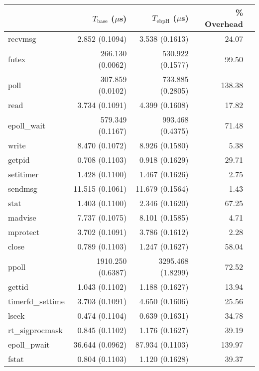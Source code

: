 \begin{tabular}{>{\ttfamily}lrrrr}
\toprule
\multicolumn{1}{l}{System Call} & $T_{\text{base}}$ ($\mu$s) & $T_{\text{ebpH}}$ ($\mu$s) &  \% Overhead \\
\midrule
                        recvmsg &             2.852 (0.1094) &             3.538 (0.1613) &        24.07 \\
                          futex &           266.130 (0.0062) &           530.922 (0.1577) &        99.50 \\
                           poll &           307.859 (0.0102) &           733.885 (0.2805) &       138.38 \\
                           read &             3.734 (0.1091) &             4.399 (0.1608) &        17.82 \\
                    epoll\_wait &           579.349 (0.1167) &           993.468 (0.4375) &        71.48 \\
                          write &             8.470 (0.1072) &             8.926 (0.1580) &         5.38 \\
                         getpid &             0.708 (0.1103) &             0.918 (0.1629) &        29.71 \\
                      setitimer &             1.428 (0.1100) &             1.467 (0.1626) &         2.75 \\
                        sendmsg &            11.515 (0.1061) &            11.679 (0.1564) &         1.43 \\
                           stat &             1.403 (0.1100) &             2.346 (0.1620) &        67.25 \\
                        madvise &             7.737 (0.1075) &             8.101 (0.1585) &         4.71 \\
                       mprotect &             3.702 (0.1091) &             3.786 (0.1612) &         2.28 \\
                          close &             0.789 (0.1103) &             1.247 (0.1627) &        58.04 \\
                          ppoll &          1910.250 (0.6387) &          3295.468 (1.8299) &        72.52 \\
                         gettid &             1.043 (0.1102) &             1.188 (0.1627) &        13.94 \\
               timerfd\_settime &             3.703 (0.1091) &             4.650 (0.1606) &        25.56 \\
                          lseek &             0.474 (0.1104) &             0.639 (0.1631) &        34.78 \\
                rt\_sigprocmask &             0.845 (0.1102) &             1.176 (0.1627) &        39.19 \\
                   epoll\_pwait &            36.644 (0.0962) &            87.934 (0.1103) &       139.97 \\
                          fstat &             0.804 (0.1103) &             1.120 (0.1628) &        39.37 \\
\bottomrule
\end{tabular}
